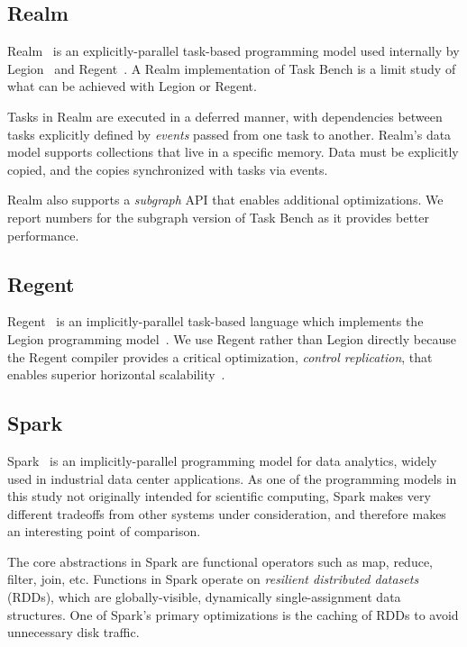 \subsection{Realm}

Realm~\cite{Realm14} is an explicitly-parallel task-based programming
model used internally by Legion~\cite{Legion12} and
Regent~\cite{Regent15}. A Realm implementation of Task Bench is a limit study of what can be achieved with Legion or Regent.

Tasks in Realm are executed in a deferred manner, with dependencies
between tasks explicitly defined by \emph{events} passed from one task
to another. Realm's data model supports collections that live in a
specific memory. Data must be explicitly copied, and the copies
synchronized with tasks via events.

Realm also supports a \emph{subgraph} API that enables additional
optimizations. We report numbers for the subgraph version of Task
Bench as it provides better performance.

\subsection{Regent}

Regent~\cite{Regent15} is an implicitly-parallel task-based language
which implements the Legion programming model~\cite{Legion12}. We use
Regent rather than Legion directly because the Regent compiler
provides a critical optimization, \emph{control replication}, that
enables superior horizontal scalability~\cite{ControlReplication17}.

\subsection{Spark}

Spark~\cite{Spark10} is an implicitly-parallel programming model for
data analytics, widely used in industrial data center applications. As
one of the programming models in this study not originally intended
for scientific computing, Spark makes very different tradeoffs from
other systems under consideration, and therefore makes an interesting
point of comparison.

The core abstractions in Spark are functional operators such as map,
reduce, filter, join, etc. Functions in Spark operate on
\emph{resilient
  distributed datasets} (RDDs), which are globally-visible,
dynamically single-assignment data structures. One of Spark's primary
optimizations is the caching of RDDs to avoid unnecessary
disk traffic.

